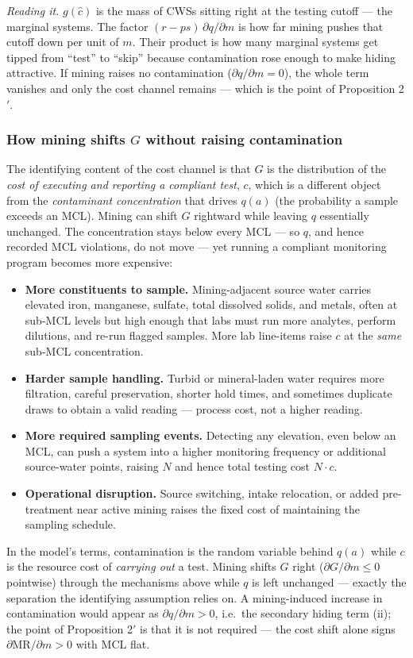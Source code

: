 \documentclass{article}
\begin{document}
\emph{Reading it.} $g(\hat{c})$ is the mass of CWSs sitting right at the testing cutoff --- the marginal systems. The factor $(r-ps)\,\partial q/\partial m$ is how far mining pushes that cutoff down per unit of $m$. Their product is how many marginal systems get tipped from ``test'' to ``skip'' because contamination rose enough to make hiding attractive. If mining raises no contamination ($\partial q/\partial m = 0$), the whole term vanishes and only the cost channel remains --- which is the point of Proposition 2$'$.

\subsubsection*{How mining shifts $G$ without raising contamination}

The identifying content of the cost channel is that $G$ is the distribution of the \emph{cost of executing and reporting a compliant test}, $c$, which is a different object from the \emph{contaminant concentration} that drives $q(a)$ (the probability a sample exceeds an MCL). Mining can shift $G$ rightward while leaving $q$ essentially unchanged. The concentration stays below every MCL --- so $q$, and hence recorded MCL violations, do not move --- yet running a compliant monitoring program becomes more expensive:
\begin{itemize}
\item \textbf{More constituents to sample.} Mining-adjacent source water carries elevated iron, manganese, sulfate, total dissolved solids, and metals, often at sub-MCL levels but high enough that labs must run more analytes, perform dilutions, and re-run flagged samples. More lab line-items raise $c$ at the \emph{same} sub-MCL concentration.
\item \textbf{Harder sample handling.} Turbid or mineral-laden water requires more filtration, careful preservation, shorter hold times, and sometimes duplicate draws to obtain a valid reading --- process cost, not a higher reading.
\item \textbf{More required sampling events.} Detecting any elevation, even below an MCL, can push a system into a higher monitoring frequency or additional source-water points, raising $N$ and hence total testing cost $N\cdot c$.
\item \textbf{Operational disruption.} Source switching, intake relocation, or added pre-treatment near active mining raises the fixed cost of maintaining the sampling schedule.
\end{itemize}
In the model's terms, contamination is the random variable behind $q(a)$ while $c$ is the resource cost of \emph{carrying out} a test. Mining shifts $G$ right ($\partial G/\partial m \le 0$ pointwise) through the mechanisms above while $q$ is left unchanged --- exactly the separation the identifying assumption relies on. A mining-induced increase in contamination would appear as $\partial q/\partial m > 0$, i.e.\ the secondary hiding term (ii); the point of Proposition 2$'$ is that it is not required --- the cost shift alone signs $\partial \text{MR}/\partial m > 0$ with MCL flat.
\end{document}
